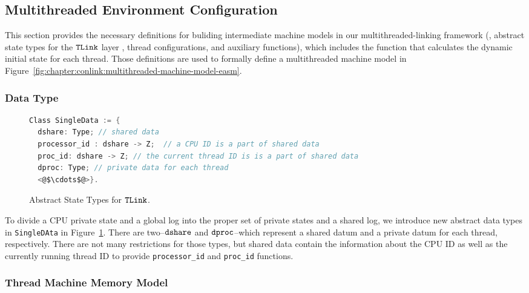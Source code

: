 
\subsection{Multithreaded Environment Configuration}
\label{chapter:linking:subsec:multithreaded-env-configuration}

This section provides the necessary definitions 
for buliding intermediate machine models in our multithreaded-linking framework
(\ie, abstract state types for the ${{\mathrm{\texttt{TLink}}}}$ layer , thread configurations, and auxiliary functions),
which includes the function that calculates the dynamic initial state for each thread.
Those definitions are used to formally define a multithreaded machine model in Figure~\ref{fig:chapter:conlink:multithreaded-machine-model-easm}.
%

\subsubsection{Data Type} 

\begin{figure}
\begin{lstlisting}[language=C, morekeywords={Class}]
Class SingleData := {
  dshare: Type; // shared data    
  processor_id : dshare -> Z;  // a CPU ID is a part of shared data
  proc_id: dshare -> Z; // the current thread ID is is a part of shared data
  dproc: Type; // private data for each thread
  <@$\cdots$@>}.
\end{lstlisting} 
\caption{Abstract State Types for ${{\mathrm{\texttt{TLink}}}}$.}
\label{fig:chapter:conlink:abs-state-types-for-tlink}
\end{figure}

To divide a CPU private state and a global log into the proper set of private states and a shared log, we introduce new abstract data types in \lstinline$SingleDAta$ in Figure~\ref{fig:chapter:conlink:abs-state-types-for-tlink}. 
There are two--${\mathrm{\texttt{dshare}}}$ and ${\mathrm{\texttt{dproc}}}$--which represent a shared datum and a private datum for each thread, respectively. 
There are not many restrictions for those types,
but shared data contain the information about the 
CPU ID as well as the currently running thread ID to provide 
\lstinline$processor_id$ and \lstinline$proc_id$ functions. 


\subsubsection{Thread Machine Memory Model}

